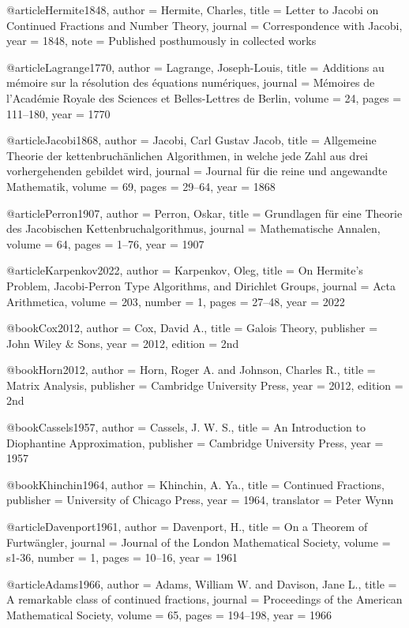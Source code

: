 @article{Hermite1848,
  author = {Hermite, Charles},
  title = {Letter to Jacobi on Continued Fractions and Number Theory},
  journal = {Correspondence with Jacobi},
  year = {1848},
  note = {Published posthumously in collected works}
}

@article{Lagrange1770,
  author = {Lagrange, Joseph-Louis},
  title = {Additions au mémoire sur la résolution des équations numériques},
  journal = {Mémoires de l'Académie Royale des Sciences et Belles-Lettres de Berlin},
  volume = {24},
  pages = {111--180},
  year = {1770}
}

@article{Jacobi1868,
  author = {Jacobi, Carl Gustav Jacob},
  title = {Allgemeine Theorie der kettenbruchänlichen Algorithmen, in welche jede Zahl aus drei vorhergehenden gebildet wird},
  journal = {Journal für die reine und angewandte Mathematik},
  volume = {69},
  pages = {29--64},
  year = {1868}
}

@article{Perron1907,
  author = {Perron, Oskar},
  title = {Grundlagen für eine Theorie des Jacobischen Kettenbruchalgorithmus},
  journal = {Mathematische Annalen},
  volume = {64},
  pages = {1--76},
  year = {1907}
}

@article{Karpenkov2022,
  author = {Karpenkov, Oleg},
  title = {On Hermite's Problem, Jacobi-Perron Type Algorithms, and Dirichlet Groups},
  journal = {Acta Arithmetica},
  volume = {203},
  number = {1},
  pages = {27--48},
  year = {2022}
}

@book{Cox2012,
  author = {Cox, David A.},
  title = {Galois Theory},
  publisher = {John Wiley \& Sons},
  year = {2012},
  edition = {2nd}
}

@book{Horn2012,
  author = {Horn, Roger A. and Johnson, Charles R.},
  title = {Matrix Analysis},
  publisher = {Cambridge University Press},
  year = {2012},
  edition = {2nd}
}

@book{Cassels1957,
  author = {Cassels, J. W. S.},
  title = {An Introduction to Diophantine Approximation},
  publisher = {Cambridge University Press},
  year = {1957}
}

@book{Khinchin1964,
  author = {Khinchin, A. Ya.},
  title = {Continued Fractions},
  publisher = {University of Chicago Press},
  year = {1964},
  translator = {Peter Wynn}
}

@article{Davenport1961,
  author = {Davenport, H.},
  title = {On a Theorem of Furtwängler},
  journal = {Journal of the London Mathematical Society},
  volume = {s1-36},
  number = {1},
  pages = {10--16},
  year = {1961}
}

@article{Adams1966,
  author = {Adams, William W. and Davison, Jane L.},
  title = {A remarkable class of continued fractions},
  journal = {Proceedings of the American Mathematical Society},
  volume = {65},
  pages = {194--198},
  year = {1966}
}

